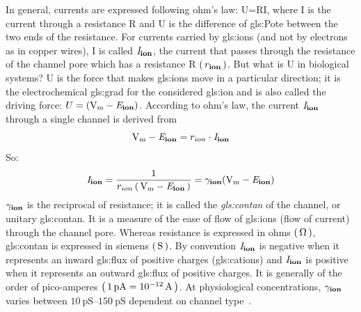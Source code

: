 \documentclass[class={myRUCProject}, crop=false]{standalone}
\begin{document}
In general, currents are expressed following ohm's law: U=RI, where I is the current through a resistance R and U is the difference of \gls{gls:Pote} between the two ends of the resistance. For currents carried by \glspl{gls:ion} (and not by electrons as in copper wires), I is called \(\mathit{I}_\mathbf{ion}\), the current that passes through the resistance of the channel pore which has a resistance R \(\br{\res\ion}\). But what is U in biological systems? U is the force that makes \glspl{gls:ion} move in a particular direction; it is the electrochemical \gls{gls:grad} for the considered \gls{gls:ion} and is also called the driving force: \(U=(\unit{\V\membrane} - \equilibria\ion)\). According to ohm's law, the current \(\mathit{I}_\mathbf{ion}\) through a single channel is derived from 
\begin{equation}
  \unit{\V\membrane} - \equilibria\ion = r_{ion} \cdot \cur\ion
\end{equation}
So:
\begin{equation}
  \cur\ion= \frac{1}{r_{ion}\br{\unit{\V\membrane} - \equilibria\ion}} = \uncon\ion(\unit{\V\membrane} - \equilibria\ion)
\end{equation}
\(\gamma_\mathbf{ion}\) is the reciprocal of resistance; it is called the \textit{\gls{gls:contan}} of the channel, or unitary \gls{gls:contan}. It is a measure of the ease of flow of \glspl{gls:ion} (flow of current) through the channel pore. Whereas resistance is expressed in ohms \(\br{\unit{\ohm}}\), \gls{gls:contan} is expressed in siemens \(\br{\unit{\siemens}}\). By convention \(\mathit{I}_\mathbf{ion}\) is negative when it represents an inward \gls{gls:flux} of positive charges (\glspl{gls:cation}) and \(\mathit{I}_\mathbf{ion}\) is positive when it represents an outward \gls{gls:flux} of positive charges. It is generally of the order of pico-amperes \(\br{\qty{1}{\pico\ampere}=\qty{e-12}{\ampere}}\). At physiological concentrations, \(\gamma_\mathbf{ion}\) varies between \(\qtyrange{10}{150}{\pico\siemens}\) dependent on channel type~\cite{}.
\end{document}
